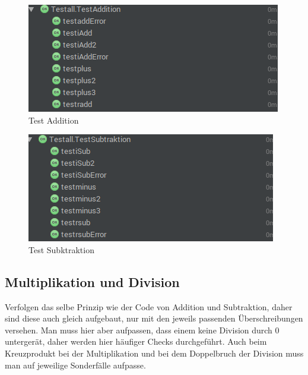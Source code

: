 \begin{figure}[!h]
	\begin{center}
		\includegraphics[width=0.6\linewidth]{images/testAdd.png}
		\caption{Test Addition}
		\label{broker}
	\end{center}
\end{figure}

\begin{figure}[!h]
	\begin{center}
		\includegraphics[width=0.6\linewidth]{images/testSub.png}
		\caption{Test Subktraktion}
		\label{broker}
	\end{center}
\end{figure}
\clearpage

\subsection{Multiplikation und Division}
Verfolgen das selbe Prinzip wie der Code von Addition und Subtraktion, daher sind diese auch gleich aufgebaut, nur mit den jeweils passenden Überschreibungen versehen. Man muss hier aber aufpassen, dass einem keine Division durch 0 untergerät, daher werden hier häufiger Checks durchgeführt. Auch beim Kreuzprodukt bei der Multiplikation und bei dem Doppelbruch der Division muss man auf jeweilige Sonderfälle aufpasse.

